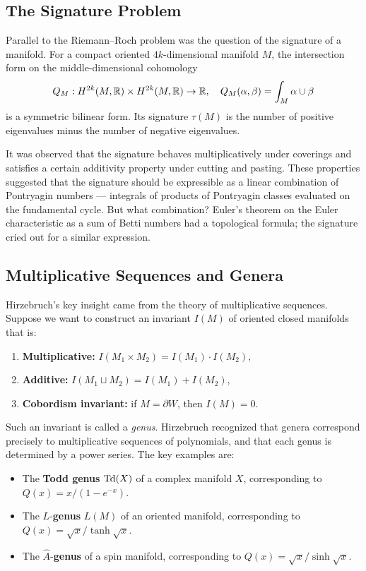 \subsection{The Signature Problem}

Parallel to the Riemann--Roch problem was the question of the signature
of a manifold. For a compact oriented \(4k\)-dimensional manifold
\(M\), the intersection form on the middle-dimensional cohomology
\[
Q_M: H^{2k}(M, \mathbb{R}) \times H^{2k}(M, \mathbb{R}) \to \mathbb{R},
\quad
Q_M(\alpha, \beta) = \int_M \alpha \cup \beta
\]
is a symmetric bilinear form. Its signature \(\tau(M)\) is the number of
positive eigenvalues minus the number of negative eigenvalues.

It was observed that the signature behaves multiplicatively under
coverings and satisfies a certain additivity property under cutting and
pasting. These properties suggested that the signature should be
expressible as a linear combination of Pontryagin numbers --- integrals
of products of Pontryagin classes evaluated on the fundamental cycle.
But what combination? Euler's theorem on the Euler characteristic as a
sum of Betti numbers had a topological formula; the signature cried out
for a similar expression.

\subsection{Multiplicative Sequences and Genera}

Hirzebruch's key insight came from the theory of multiplicative
sequences. Suppose we want to construct an invariant \(I(M)\) of
oriented closed manifolds that is:
\begin{enumerate}
    \item \textbf{Multiplicative:}
    \(I(M_1 \times M_2) = I(M_1) \cdot I(M_2)\),
    \item \textbf{Additive:}
    \(I(M_1 \sqcup M_2) = I(M_1) + I(M_2)\),
    \item \textbf{Cobordism invariant:}
    if \(M = \partial W\), then \(I(M) = 0\).
\end{enumerate}

Such an invariant is called a \textit{genus}. Hirzebruch recognized that
genera correspond precisely to multiplicative sequences of polynomials,
and that each genus is determined by a power series. The key examples
are:
\begin{itemize}
    \item The \textbf{Todd genus} \(\operatorname{Td}(X)\) of a complex manifold
    \(X\), corresponding to \(Q(x) = x/(1 - e^{-x})\).
    \item The \(L\)-{\bf genus} \(L(M)\) of an oriented manifold,
    corresponding to \(Q(x) = \sqrt{x}/\tanh\sqrt{x}\).
    \item The \(\hat{A}\)-{\bf genus} of a spin manifold, corresponding
    to \(Q(x) = \sqrt{x}/\sinh\sqrt{x}\).
\end{itemize}

